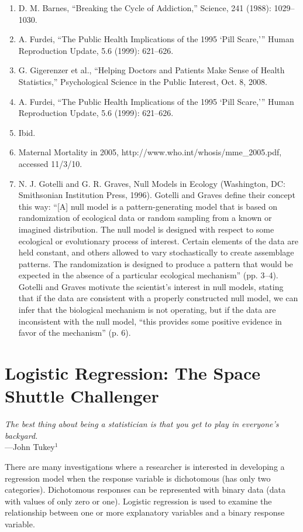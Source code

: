 \documentclass[
]{report}
\begin{document}
\begin{enumerate}
\item D. M. Barnes, “Breaking the Cycle of Addiction,” Science, 241 (1988): 1029–1030.
\item A. Furdei, “The Public Health Implications of the 1995 ‘Pill Scare,’” Human Reproduction Update, 5.6 (1999): 621–626.
\item G. Gigerenzer et al., “Helping Doctors and Patients Make Sense of Health Statistics,” Psychological Science in the
Public Interest, Oct. 8, 2008.
\item A. Furdei, “The Public Health Implications of the 1995 ‘Pill Scare,’” Human Reproduction Update, 5.6 (1999):
621–626.
\item Ibid.
\item Maternal Mortality in 2005, http://www.who.int/whosis/mme\_2005.pdf, accessed 11/3/10.
\item N. J. Gotelli and G. R. Graves, Null Models in Ecology (Washington, DC: Smithsonian Institution Press, 1996).
Gotelli and Graves define their concept this way: “[A] null model is a pattern-generating model that is based on
randomization of ecological data or random sampling from a known or imagined distribution. The null model is
designed with respect to some ecological or evolutionary process of interest. Certain elements of the data are held
constant, and others allowed to vary stochastically to create assemblage patterns. The randomization is designed to
produce a pattern that would be expected in the absence of a particular ecological mechanism” (pp. 3–4). Gotelli
and Graves motivate the scientist’s interest in null models, stating that if the data are consistent with a properly
constructed null model, we can infer that the biological mechanism is not operating, but if the data are inconsistent
with the null model, “this provides some positive evidence in favor of the mechanism” (p. 6).

\end{enumerate}

\chapter{Logistic Regression: The Space Shuttle Challenger}\label{logistic-regression-the-space-shuttle-challenger}

\emph{The best thing about being a statistician is that you get to play in everyone's backyard.}\\
---John Tukey\(^1\)

There are many investigations where a researcher is interested in developing a regression model when the response variable is dichotomous (has only two categories). Dichotomous responses can be represented with binary data (data with values of only zero or one). Logistic regression is used to examine the relationship between one or more explanatory variables and a binary response variable.
\end{document}
